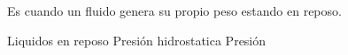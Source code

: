 
\question Es cuando un fluido genera su propio peso estando en reposo.

  \begin{oneparchoices}
    \choice  Liquidos en reposo
    \CorrectChoice Presión hidrostatica
    \choice Presión
  \end{oneparchoices}
